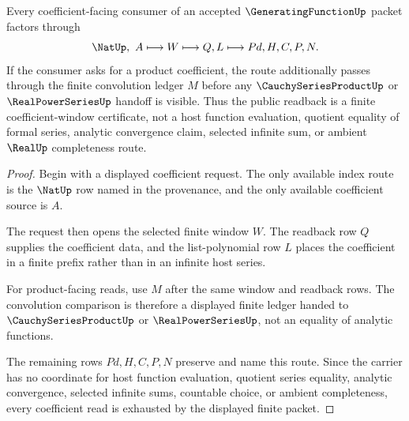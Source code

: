 \begin{theorem}
\label{thm:generating-function-coefficient-readback}
Every coefficient-facing consumer of an accepted $\GeneratingFunctionUp$ packet factors through
$$
\NatUp,\ A \longmapsto W \longmapsto Q,L \longmapsto Pd,H,C,P,N .
$$
If the consumer asks for a product coefficient, the route additionally passes through the finite convolution ledger $M$ before any $\CauchySeriesProductUp$ or $\RealPowerSeriesUp$ handoff is visible. Thus the public readback is a finite coefficient-window certificate, not a host function evaluation, quotient equality of formal series, analytic convergence claim, selected infinite sum, or ambient $\RealUp$ completeness route.
\end{theorem}
\begin{proof}
Begin with a displayed coefficient request. The only available index route is the $\NatUp$ row named in the provenance, and the only available coefficient source is $A$.

The request then opens the selected finite window $W$. The readback row $Q$ supplies the coefficient data, and the list-polynomial row $L$ places the coefficient in a finite prefix rather than in an infinite host series.

For product-facing reads, use $M$ after the same window and readback rows. The convolution comparison is therefore a displayed finite ledger handed to $\CauchySeriesProductUp$ or $\RealPowerSeriesUp$, not an equality of analytic functions.

The remaining rows $Pd,H,C,P,N$ preserve and name this route. Since the carrier has no coordinate for host function evaluation, quotient series equality, analytic convergence, selected infinite sums, countable choice, or ambient completeness, every coefficient read is exhausted by the displayed finite packet.
\end{proof}


